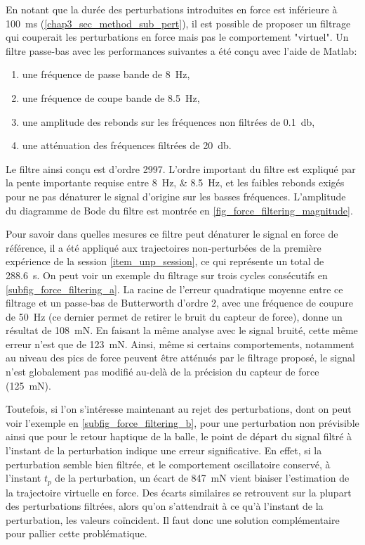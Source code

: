 En notant que la durée des perturbations introduites en force est inférieure à \SI{100}{\milli\second} (\cref{chap3_sec_method_sub_pert}), il est possible de proposer un filtrage qui couperait les perturbations en force mais pas le comportement "virtuel". Un filtre passe-bas avec les performances suivantes a été conçu avec l'aide de Matlab:
\begin{enumerate}[label={-}]
	\item une fréquence de passe bande de \SI{8}{\hertz},
	\item une fréquence de coupe bande de \SI{8.5}{\hertz},
	\item une amplitude des rebonds sur les fréquences non filtrées de \SI{0.1}{\decibel},
	\item une atténuation des fréquences filtrées de \SI{20}{\decibel}.
\end{enumerate}
Le filtre ainsi conçu est d'ordre 2997. L'ordre important du filtre est expliqué par la pente importante requise entre \SIlist{8;8.5}{\hertz}, et les faibles rebonds exigés pour ne pas dénaturer le signal d'origine sur les basses fréquences. L'amplitude du diagramme de Bode du filtre est montrée en \cref{fig_force_filtering_magnitude}.



Pour savoir dans quelles mesures ce filtre peut dénaturer le signal en force de référence, il a été appliqué aux trajectoires non-perturbées de la première expérience de la session \cref{item_unp_session}, ce qui représente un total de \SI{288.6}{\second}. On peut voir un exemple du filtrage sur trois cycles consécutifs en \cref{subfig_force_filtering_a}. La racine de l'erreur quadratique moyenne entre ce filtrage et un passe-bas de Butterworth d'ordre 2, avec une fréquence de coupure de \SI{50}{\hertz} (ce dernier permet de retirer le bruit du capteur de force), donne un résultat de \SI{108}{\milli\newton}. En faisant la même analyse avec le signal bruité, cette même erreur n'est que de \SI{123}{\milli\newton}. Ainsi, même si certains comportements, notamment au niveau des pics de force peuvent être atténués par le filtrage proposé, le signal n'est globalement pas modifié au-delà de la précision du capteur de force (\SI{125}{\milli\newton}).

Toutefois, si l'on s'intéresse maintenant au rejet des perturbations, dont on peut voir l'exemple en \cref{subfig_force_filtering_b}, pour une perturbation non prévisible ainsi que pour le retour haptique de la balle, le point de départ du signal filtré à l'instant de la perturbation indique une erreur significative. En effet, si la perturbation semble bien filtrée, et le comportement oscillatoire conservé, à l'instant $t_p$ de la perturbation, un écart de \SI{847}{\milli\newton} vient biaiser l'estimation de la trajectoire virtuelle en force. Des écarts similaires se retrouvent sur la plupart des perturbations filtrées, alors qu'on s'attendrait à ce qu'à l'instant de la perturbation, les valeurs coïncident. Il faut donc une solution complémentaire pour pallier cette problématique.

